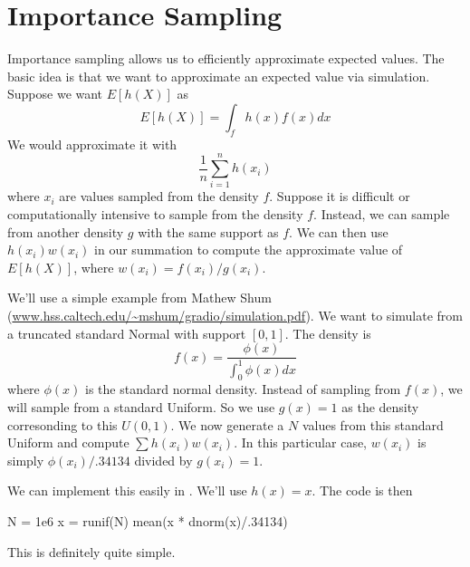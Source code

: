 \section{Importance Sampling} 

Importance sampling allows us to efficiently approximate expected
values.  The basic idea is that we want to approximate an expected
value via simulation. 
Suppose we want $E[h(X)]$ as 
$$
 E[h(X)] = \int_f h(x) f(x) dx
$$
We would approximate it with
$$
  \frac{1}{n} \sum_{i=1}^n h(x_i)
$$
where $x_i$ are values sampled from the density $f$.
Suppose it is difficult or computationally intensive to sample from
the density $f$.
Instead, we can sample from another  density $g$ with
the same support as $f$.
We can then use $h(x_i) w(x_i)$ in our summation
to compute the approximate value of $E[h(X)]$,
where $w(x_i) = f(x_i)/g(x_i)$.


We'll use a simple example from Mathew Shum
(\url{www.hss.caltech.edu/~mshum/gradio/simulation.pdf}).
We want to simulate from a truncated standard Normal with support
$[0,1]$.
The density is 
$$f(x) = \frac{\phi(x)}{\int_0^1 \phi(x) dx}$$ where $\phi(x)$ is the
standard normal density.  Instead of sampling from $f(x)$, we will
sample from a standard Uniform. So we use $g(x) = 1$ as the density
corresonding to this $U(0, 1)$.  We now generate a $N$ values from
this standard Uniform and compute $\sum h(x_i) w(x_i)$.  In this
particular case, $w(x_i)$ is simply $\phi(x_i)/.34134$ divided by
$g(x_i) = 1$.

We can implement this easily in \R{}.
We'll use $h(x) = x$.
The code is then
\begin{RCode}
N = 1e6
x = runif(N)
mean(x * dnorm(x)/.34134)
\end{RCode}
This is definitely quite simple. 

